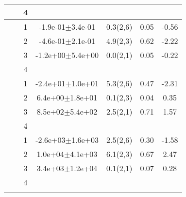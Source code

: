 \begin{longtable}{llccccS[table-format=-2.2, table-space-text-post = {***}]}
   &  & 4 &  &  &  &  \\ 
   \midrule
{} & {} & 1 & -1.9e-01$\pm$3.4e-01 & 0.3(2,6) & 0.05 & -0.56 \\ 
   &  & 2 & -4.6e-01$\pm$2.1e-01 & 4.9(2,3) & 0.62 & -2.22 \\ 
   &  & 3 & -1.2e+00$\pm$5.4e+00 & 0.0(2,1) & 0.05 & -0.22 \\ 
   &  & 4 &  &  &  &  \\ 
   \midrule
{} & {} & 1 & -2.4e+01$\pm$1.0e+01 & 5.3(2,6) & 0.47 & -2.31 \\ 
   &  & 2 &  6.4e+00$\pm$1.8e+01 & 0.1(2,3) & 0.04 & 0.35 \\ 
   &  & 3 &  8.5e+02$\pm$5.4e+02 & 2.5(2,1) & 0.71 & 1.57 \\ 
   &  & 4 &  &  &  &  \\ 
   \midrule
{} & {} & 1 & -2.6e+03$\pm$1.6e+03 & 2.5(2,6) & 0.30 & -1.58 \\ 
   &  & 2 &  1.0e+04$\pm$4.1e+03 & 6.1(2,3) & 0.67 & 2.47 \\ 
   &  & 3 &  3.4e+03$\pm$1.2e+04 & 0.1(2,1) & 0.07 & 0.28 \\ 
   &  & 4 &  &  &  &  \\ 
   \bottomrule
\label{bivar_lm_summ_veg_type}
\end{longtable}

